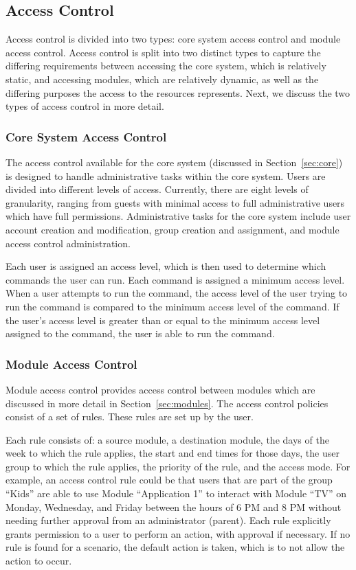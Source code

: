\subsection{Access Control}
\label{sec:access}
Access control is divided into two types: core system access control and module
access control. Access control is split into two distinct types to capture the
differing requirements between accessing the core system, which is relatively
static, and accessing modules, which are relatively dynamic, as well as the
differing purposes the access to the resources represents. Next, we discuss the
two types of access control in more detail.
\subsubsection{Core System Access Control}
\label{sec:core_access}
The access control available for the core system (discussed in
Section~\ref{sec:core}) is designed to handle administrative tasks within the
core system. Users are divided into different levels of access. Currently, there
are eight levels of granularity, ranging from guests with minimal access to
full administrative users which have full permissions. Administrative tasks for
the core system include user account creation and modification, group creation
and assignment, and module access control administration.

Each user is assigned an access level, which is then used to determine which
commands the user can run. Each command is assigned a minimum access level.
When a user attempts to run the command, the access level of the user trying to
run the command is compared to the minimum access level of the command. If the
user's access level is greater than or equal to the minimum access level
assigned to the command, the user is able to run the command.
\subsubsection{Module Access Control}
\label{sec:module_access}
Module access control provides access control between modules which are
discussed in more detail in Section~\ref{sec:modules}. The access control
policies consist of a set of rules. These rules are set up by the user.

Each rule consists of: a source module, a destination module, the days of the
week to which the rule applies, the start and end times for those days, the user
group to which the rule applies, the priority of the rule, and the access mode.
For example, an access control rule could be that users that are part of the
group ``Kids'' are able to use Module ``Application 1'' to interact with Module
``TV'' on Monday, Wednesday, and Friday between the hours of 6 PM and 8 PM
without needing further approval from an administrator (parent). Each rule
explicitly grants permission to a user to perform an action, with approval if
necessary. If no rule is found for a scenario, the default action is taken,
which is to not allow the action to occur.

